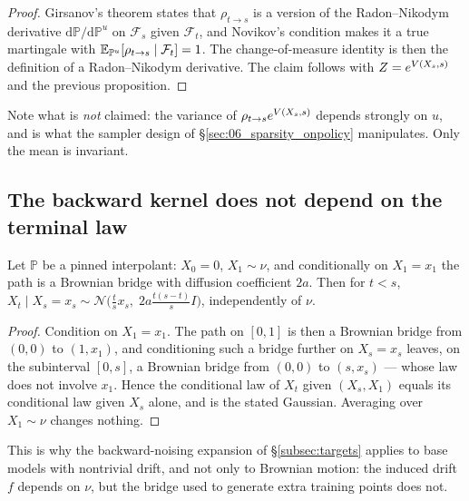 \begin{proof}
Girsanov's theorem states that $\rho_{t\to s}$ is a version of the
Radon--Nikodym derivative $\mathrm{d}\mathbb{P}/\mathrm{d}\mathbb{P}^{u}$ on
$\mathcal{F}_s$ given $\mathcal{F}_t$, and Novikov's condition makes it a
true martingale with $\mathbb{E}_{\mathbb{P}^{u}}[\rho_{t\to s}\mid\mathcal{F}_t]=1$.
The change-of-measure identity is then the definition of a
Radon--Nikodym derivative. The claim follows with $Z=e^{V(X_s,s)}$ and the
previous proposition.
\end{proof}

\noindent Note what is \emph{not} claimed: the variance of
$\rho_{t\to s}e^{V(X_s,s)}$ depends strongly on $u$, and is what the
sampler design of \S\ref{sec:06_sparsity_onpolicy} manipulates. Only the mean
is invariant.

\subsection{The backward kernel does not depend on the terminal law}

\begin{proposition}
Let $\mathbb{P}$ be a pinned interpolant: $X_0=0$, $X_1\sim\nu$, and
conditionally on $X_1=x_1$ the path is a Brownian bridge with diffusion
coefficient $2a$. Then for $t<s$,
$X_t\mid X_s=x_s \sim \mathcal{N}\big(\tfrac{t}{s}x_s,\;2a\tfrac{t(s-t)}{s}I\big)$,
independently of $\nu$.
\end{proposition}

\begin{proof}
Condition on $X_1=x_1$. The path on $[0,1]$ is then a Brownian bridge from
$(0,0)$ to $(1,x_1)$, and conditioning such a bridge further on $X_s=x_s$
leaves, on the subinterval $[0,s]$, a Brownian bridge from $(0,0)$ to
$(s,x_s)$ --- whose law does not involve $x_1$. Hence the conditional law of
$X_t$ given $(X_s,X_1)$ equals its conditional law given $X_s$ alone, and is
the stated Gaussian. Averaging over $X_1\sim\nu$ changes nothing.
\end{proof}

\noindent This is why the backward-noising expansion of
\S\ref{subsec:targets} applies to base models with nontrivial drift, and not
only to Brownian motion: the induced drift $f$ depends on
$\nu$, but the bridge used to generate extra training points does not.
